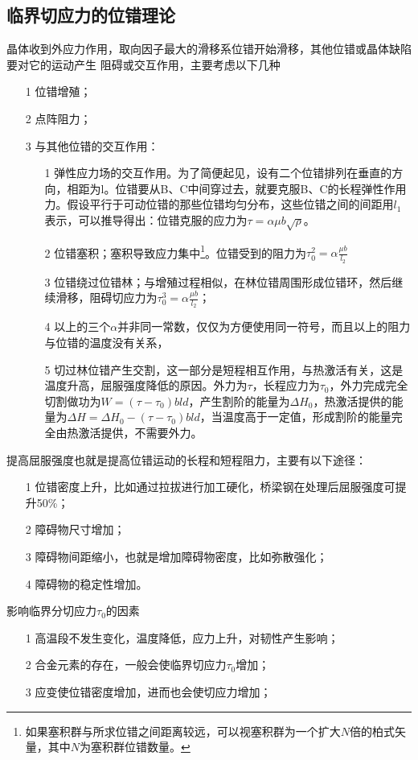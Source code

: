         \subsection{临界切应力的位错理论}
            晶体收到外应力作用，取向因子最大的滑移系位错开始滑移，其他位错或晶体缺陷要对它的运动产生
            阻碍或交互作用，主要考虑以下几种
            \begin{enumerate}
                \item[1] 位错增殖；
                \item[2] 点阵阻力；
                \item[3] 与其他位错的交互作用：
                \begin{enumerate}
                    \item[1] 弹性应力场的交互作用。为了简便起见，设有二个位错排列在垂直的方向，相距为l。位错要从B、C中间穿过去，就要克服B、C的长程弹性作用力。假设平行于可动位错的那些位错均匀分布，这些位错之间的间距用$l_1$表示，可以推导得出：位错克服的应力为$\tau=\alpha\mu b\sqrt{\rho}$。
                    \item[2] 位错塞积；塞积导致应力集中\footnote{如果塞积群与所求位错之间距离较远，可以视塞积群为一个扩大$N$倍的柏式矢量，其中$N$为塞积群位错数量。}。位错受到的阻力为$\tau_0^2=\alpha\frac{\mu b}{l_2}$
                    \item[3] 位错绕过位错林；与增殖过程相似，在林位错周围形成位错环，然后继续滑移，阻碍切应力为$\tau_0^3=\alpha\frac{\mu b}{l_2}$；
                    \item[4] 以上的三个$\alpha$并非同一常数，仅仅为方便使用同一符号，而且以上的阻力与位错的温度没有关系，
                    \item[5] 切过林位错产生交割，这一部分是短程相互作用，与热激活有关，这是温度升高，屈服强度降低的原因。外力为$\tau$，长程应力为$\tau_0$，外力完成完全切割做功为$W=(\tau-\tau_0)bld$，产生割阶的能量为$\Delta H_0$，热激活提供的能量为$\Delta H=\Delta H_0-(\tau-\tau_0)bld$，当温度高于一定值，形成割阶的能量完全由热激活提供，不需要外力。
                \end{enumerate} 
            \end{enumerate}
            提高屈服强度也就是提高位错运动的长程和短程阻力，主要有以下途径：
            \begin{itemize}
                \item[1] 位错密度上升，比如通过拉拔进行加工硬化，桥梁钢在处理后屈服强度可提升50\%；
                \item[2] 障碍物尺寸增加；
                \item[3] 障碍物间距缩小，也就是增加障碍物密度，比如弥散强化；
                \item[4] 障碍物的稳定性增加。
            \end{itemize}
            影响临界分切应力$\tau_0$的因素
            \begin{itemize}
                \item[1] 高温段不发生变化，温度降低，应力上升，对韧性产生影响；
                \item[2] 合金元素的存在，一般会使临界切应力$\tau_0$增加；
                \item[3] 应变使位错密度增加，进而也会使切应力增加；
            \end{itemize}
